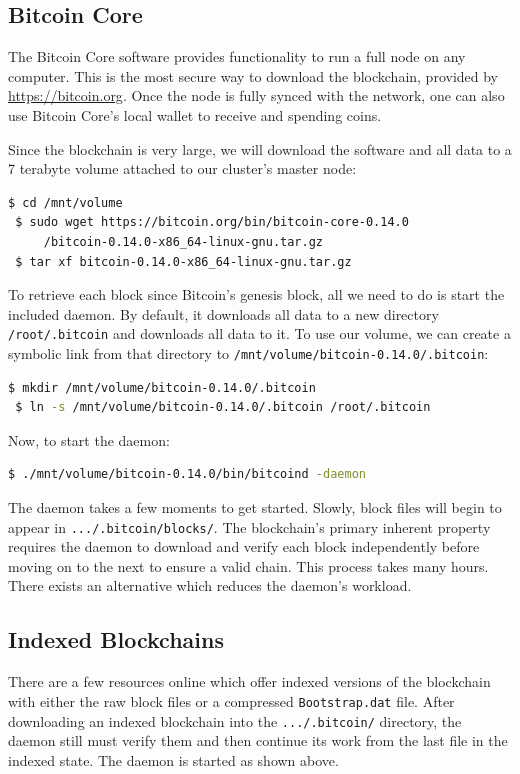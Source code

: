 \documentclass[9pt,twocolumn,twoside]{idsi}
\begin{document}
\subsection{Bitcoin Core}
The Bitcoin Core software provides functionality to run a full node on any computer. This is the most secure way to download the blockchain, provided by \href{https://bitcoin.org}{https://bitcoin.org}. Once the node is fully synced with the network, one can also use Bitcoin Core's local wallet to receive and spending coins.

Since the blockchain is very large, we will download the software and all data to a 7 terabyte volume attached to our cluster's master node:
\begin{lstlisting}[language=bash]
 $ cd /mnt/volume
 $ sudo wget https://bitcoin.org/bin/bitcoin-core-0.14.0
     /bitcoin-0.14.0-x86_64-linux-gnu.tar.gz
 $ tar xf bitcoin-0.14.0-x86_64-linux-gnu.tar.gz
\end{lstlisting}

To retrieve each block since Bitcoin's genesis block, all we need to do is start the included daemon. By default, it downloads all data to a new directory \lstinline{/root/.bitcoin} and downloads all data to it. To use our volume, we can create a symbolic link from that directory to \lstinline{/mnt/volume/bitcoin-0.14.0/.bitcoin}:
\begin{lstlisting}[language=bash]
 $ mkdir /mnt/volume/bitcoin-0.14.0/.bitcoin
 $ ln -s /mnt/volume/bitcoin-0.14.0/.bitcoin /root/.bitcoin
\end{lstlisting}

Now, to start the daemon:
\begin{lstlisting}[language=bash]
 $ ./mnt/volume/bitcoin-0.14.0/bin/bitcoind -daemon
\end{lstlisting}

The daemon takes a few moments to get started. Slowly, block files will begin to appear in \lstinline{.../.bitcoin/blocks/}.  The blockchain's primary inherent property requires the daemon to download and verify each block independently before moving on to the next to ensure a valid chain. This process takes many hours. There exists an alternative which reduces the daemon's workload.

\subsection{Indexed Blockchains}
There are a few resources online which offer indexed versions of the blockchain with either the raw block files or a compressed \lstinline{Bootstrap.dat} file. After downloading an indexed blockchain into the \lstinline{.../.bitcoin/} directory, the daemon still must verify them and then continue its work from the last file in the indexed state. The daemon is started as shown above.
\end{document}
